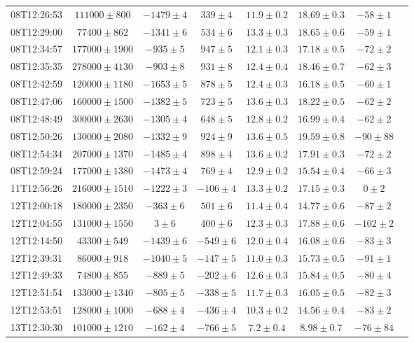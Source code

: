 \begin{table}
\begin{tabular}{lcccccc p{\columnwidth}}
08T12:26:53 &  $111000 \pm  800$ & $-1479 \pm 4$  & $  339 \pm 4$  &  $ 11.9 \pm 0.2$ &  $ 18.69 \pm 0.3$ & $ -58 \pm 1$ \\
08T12:29:00 &  $ 77400 \pm  862$ & $-1341 \pm 6$  & $  534 \pm 6$  &  $ 13.3 \pm 0.3$ &  $ 18.65 \pm 0.6$ & $ -59 \pm 1$ \\
08T12:34:57 &  $177000 \pm 1900$ & $ -935 \pm 5$  & $  947 \pm 5$  &  $ 12.1 \pm 0.3$ &  $ 17.18 \pm 0.5$ & $ -72 \pm 2$ \\
08T12:35:35 &  $278000 \pm 4130$ & $ -903 \pm 8$  & $  931 \pm 8$  &  $ 12.4 \pm 0.4$ &  $ 18.46 \pm 0.7$ & $ -62 \pm 3$ \\
08T12:42:59 &  $120000 \pm 1180$ & $-1653 \pm 5$  & $  878 \pm 5$  &  $ 12.4 \pm 0.3$ &  $ 16.18 \pm 0.5$ & $ -60 \pm 1$ \\
08T12:47:06 &  $160000 \pm 1500$ & $-1382 \pm 5$  & $  723 \pm 5$  &  $ 13.6 \pm 0.3$ &  $ 18.22 \pm 0.5$ & $ -62 \pm 2$ \\
08T12:48:49 &  $300000 \pm 2630$ & $-1305 \pm 4$  & $  648 \pm 5$  &  $ 12.8 \pm 0.2$ &  $ 16.99 \pm 0.4$ & $ -62 \pm 2$ \\
08T12:50:26 &  $130000 \pm 2080$ & $-1332 \pm 9$  & $  924 \pm 9$  &  $ 13.6 \pm 0.5$ &  $ 19.59 \pm 0.8$ & $ -90 \pm 88$ \\
08T12:54:34 &  $207000 \pm 1370$ & $-1485 \pm 4$  & $  898 \pm 4$  &  $ 13.6 \pm 0.2$ &  $ 17.91 \pm 0.3$ & $ -72 \pm 2$ \\
08T12:59:24 &  $177000 \pm 1380$ & $-1473 \pm 4$  & $  769 \pm 4$  &  $ 12.9 \pm 0.2$ &  $ 15.54 \pm 0.4$ & $ -66 \pm 3$ \\
11T12:56:26 &  $216000 \pm 1510$ & $-1222 \pm 3$  & $ -106 \pm 4$  &  $ 13.3 \pm 0.2$ &  $ 17.15 \pm 0.3$ & $  0  \pm 2$ \\
12T12:00:18 &  $180000 \pm 2350$ & $ -363 \pm 6$  & $  501 \pm 6$  &  $ 11.4 \pm 0.4$ &  $ 14.77 \pm 0.6$ & $ -87 \pm 2$ \\
12T12:04:55 &  $131000 \pm 1550$ & $    3 \pm 6$  & $  400 \pm 6$  &  $ 12.3 \pm 0.3$ &  $ 17.88 \pm 0.6$ & $-102 \pm 2$ \\
12T12:14:50 &  $ 43300 \pm  549$ & $-1439 \pm 6$  & $ -549 \pm 6$  &  $ 12.0 \pm 0.4$ &  $ 16.08 \pm 0.6$ & $ -83 \pm 3$ \\
12T12:39:31 &  $ 86000 \pm  918$ & $-1040 \pm 5$  & $ -147 \pm 5$  &  $ 11.0 \pm 0.3$ &  $ 15.73 \pm 0.5$ & $ -91 \pm 1$ \\
12T12:49:33 &  $ 74800 \pm  855$ & $ -889 \pm 5$  & $ -202 \pm 6$  &  $ 12.6 \pm 0.3$ &  $ 15.84 \pm 0.5$ & $ -80 \pm 4$ \\
12T12:51:54 &  $133000 \pm 1340$ & $ -805 \pm 5$  & $ -338 \pm 5$  &  $ 11.7 \pm 0.3$ &  $ 16.05 \pm 0.5$ & $ -82 \pm 3$ \\
12T12:53:51 &  $128000 \pm 1000$ & $ -688 \pm 4$  & $ -436 \pm 4$  &  $ 10.3 \pm 0.2$ &  $ 14.56 \pm 0.4$ & $ -83 \pm 2$ \\
13T12:30:30 &  $101000 \pm 1210$ & $ -162 \pm 4$  & $ -766 \pm 5$  &  $  7.2 \pm 0.4$ &  $  8.98 \pm 0.7$ & $ -76 \pm 84$ \\
\bottomrule

\end{tabular}

\end{table}
